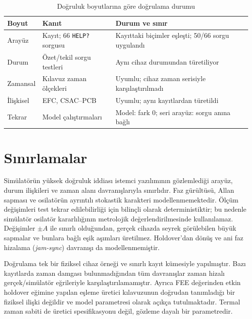 \documentclass[9pt,twocolumn,a4paper]{extarticle}
\begin{document}
\begin{table}[t]
\caption{Doğruluk boyutlarına göre doğrulama durumu}
\label{tab:dims}
\centering
\fontsize{9}{10.8}\selectfont
\setlength{\tabcolsep}{3pt}
\begin{tabular}{>{\raggedright\arraybackslash}p{}>{\raggedright\arraybackslash}p{}>{\raggedright\arraybackslash}p{}}
\toprule
\textbf{Boyut} & \textbf{Kanıt} & \textbf{Durum ve sınır} \\
\midrule
Arayüz & Kayıt; 66 \texttt{HELP?} sorgusu & Kayıttaki biçimler eşleşti; 50/66 sorgu uygulandı \\
Durum & Özet/tekil sorgu testleri & Aynı cihaz durumundan türetiliyor \\
Zamansal & Kılavuz zaman ölçekleri & Uyumlu; cihaz zaman serisiyle karşılaştırılmadı \\
İlişkisel & EFC, CSAC--PCB & Uyumlu; aynı kayıtlardan türetildi \\
Tekrar & Model çalıştırmaları & Model: fark 0; seri arayüz: sorgu anına bağlı \\
\bottomrule
\end{tabular}
\end{table}

\section{Sınırlamalar}
Simülatörün yüksek doğruluk iddiası istemci yazılımının gözlemlediği arayüz, durum ilişkileri ve zaman alanı davranışlarıyla sınırlıdır. Faz gürültüsü, Allan sapması ve osilatörün ayrıntılı stokastik karakteri modellenmemektedir. Ölçüm değişimleri test tekrar edilebilirliği için bilinçli olarak deterministiktir; bu nedenle simülatör osilatör kararlılığının metrolojik değerlendirilmesinde kullanılamaz. Değişimler $\pm A$ ile sınırlı olduğundan, gerçek cihazda seyrek görülebilen büyük sapmalar ve bunlara bağlı eşik aşımları üretilmez. Holdover'dan dönüş ve ani faz hizalama (\emph{jam-sync}) davranışı da modellenmemiştir.

Doğrulama tek bir fiziksel cihaz örneği ve sınırlı kayıt kümesiyle yapılmıştır. Bazı kayıtlarda zaman damgası bulunmadığından tüm davranışlar zaman hizalı gerçek/simülatör eğrileriyle karşılaştırılamamıştır. Ayrıca FEE değerinden etkin holdover eğimine yapılan eşleme üretici kılavuzunun doğrudan tanımladığı bir fiziksel ilişki değildir ve model parametresi olarak açıkça tutulmaktadır. Termal zaman sabiti de üretici spesifikasyonu değil, gözleme dayalı bir parametredir.
\end{document}
